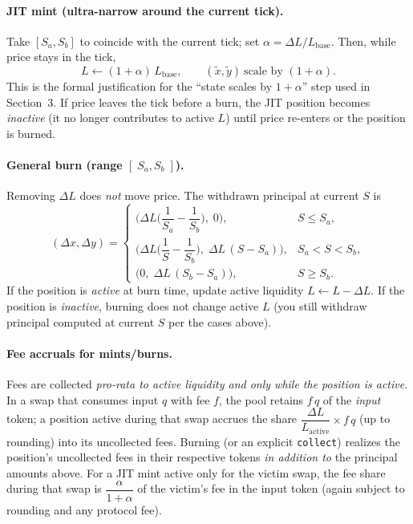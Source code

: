 \documentclass[a4paper,11pt]{article}
\begin{document}
\paragraph{JIT mint (ultra-narrow around the current tick).}
Take \([S_a,S_b]\) to coincide with the current tick; set \(\alpha=\Delta L/L_{\mathrm{base}}\).
Then, while price stays in the tick,
\begin{equation}
L \leftarrow (1+\alpha)\,L_{\mathrm{base}},\qquad
(\tilde x,\tilde y)\ \text{scale by }(1+\alpha).
\end{equation}
This is the formal justification for the “state scales by \(1+\alpha\)” step used in Section~3.
If price leaves the tick before a burn, the JIT position becomes \emph{inactive} (it no longer contributes to active \(L\)) until price re-enters or the position is burned.

\paragraph{General burn (range \([\;S_a,S_b\;]\)).}
Removing \(\Delta L\) does \emph{not} move price.
The withdrawn principal at current \(S\) is
\begin{equation}
(\Delta x,\Delta y)=
\begin{cases}
\Big(\Delta L\!\big(\dfrac{1}{S_a}-\dfrac{1}{S_b}\big),\; 0\Big), & S\le S_a,\\[8pt]
\Big(\Delta L\!\big(\dfrac{1}{S}-\dfrac{1}{S_b}\big),\; \Delta L\,(S-S_a)\Big), & S_a<S<S_b,\\[8pt]
\Big(0,\; \Delta L\,(S_b-S_a)\Big), & S\ge S_b.
\end{cases}
\end{equation}
If the position is \emph{active} at burn time, update active liquidity \(L\leftarrow L-\Delta L\).
If the position is \emph{inactive}, burning does not change active \(L\) (you still withdraw principal computed at current \(S\) per the cases above).

\paragraph{Fee accruals for mints/burns.}
Fees are collected \emph{pro-rata to active liquidity and only while the position is active}.
In a swap that consumes input \(q\) with fee \(f\), the pool retains \(f\,q\) of the \emph{input} token; a position active during that swap accrues the share
\(\dfrac{\Delta L}{L_{\mathrm{active}}}\times f\,q\)
(up to rounding) into its uncollected fees.
Burning (or an explicit \texttt{collect}) realizes the position’s uncollected fees in their respective tokens \emph{in addition to} the principal amounts above.
For a JIT mint active only for the victim swap, the fee share during that swap is \(\dfrac{\alpha}{1+\alpha}\) of the victim’s fee in the input token (again subject to rounding and any protocol fee).
\end{document}
